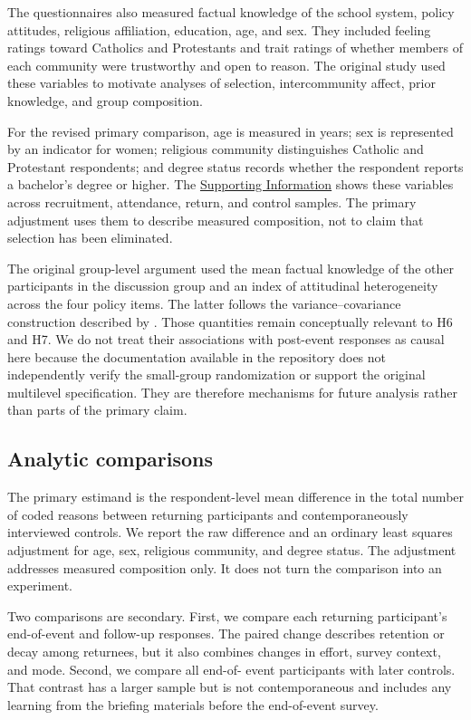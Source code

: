 \documentclass[11pt]{article}
\begin{document}
The questionnaires also measured factual knowledge of the school system, policy attitudes,
religious affiliation, education, age, and sex. They included feeling ratings toward Catholics
and Protestants and trait ratings of whether members of each community were trustworthy and
open to reason. The original study used these variables to motivate analyses of selection,
intercommunity affect, prior knowledge, and group composition.

For the revised primary comparison, age is measured in years; sex is represented by an
indicator for women; religious community distinguishes Catholic and Protestant respondents;
and degree status records whether the respondent reports a bachelor's degree or higher. The
\hyperref[sec:supplement]{Supporting Information} shows these variables across recruitment, attendance, return, and
control samples. The primary adjustment uses them to describe measured composition, not to
claim that selection has been eliminated.

The original group-level argument used the mean factual knowledge of the other participants in
the discussion group and an index of attitudinal heterogeneity across the four policy items.
The latter follows the variance--covariance construction described by
\citet{anderson2003introduction}.
Those quantities remain conceptually relevant to H6 and H7. We do not treat their associations
with post-event responses as causal here because the documentation available in the repository
does not independently verify the small-group randomization or support the original multilevel
specification. They are therefore mechanisms for future analysis rather than parts of the
primary claim.

\subsection{Analytic comparisons}

The primary estimand is the respondent-level mean difference in the total number of coded
reasons between returning participants and contemporaneously interviewed controls. We report
the raw difference and an ordinary least squares adjustment for age, sex, religious community,
and degree status. The adjustment addresses measured composition only. It does not turn the
comparison into an experiment.

Two comparisons are secondary. First, we compare each returning participant's end-of-event
and follow-up responses. The paired change describes retention or decay among returnees, but
it also combines changes in effort, survey context, and mode. Second, we compare all end-of-
event participants with later controls. That contrast has a larger sample but is not
contemporaneous and includes any learning from the briefing materials before the end-of-event
survey.
\end{document}
